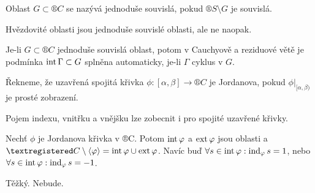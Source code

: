 \documentclass[12pt]{article}					%
\begin{document}
\begin{definice}
	Oblast $G \subset ®C$ se nazývá jednoduše souvislá, pokud $®S \setminus G$ je souvislá.
\end{definice}

\begin{poznamka}
	Hvězdovité oblasti jsou jednoduše souvislé oblasti, ale ne naopak.

	Je-li $G \subset ®C$ jednoduše souvislá oblast, potom v Cauchyově a reziduové větě je podmínka $\operatorname{int} \Gamma \subset G$ splněna automaticky, je-li $\Gamma$ cyklus v $G$.
\end{poznamka}

\begin{definice}
	Řekneme, že uzavřená spojitá křivka $\phi: [\alpha, \beta] \rightarrow ®C$ je Jordanova, pokud $\phi|_{[\alpha, \beta)}$ je prosté zobrazení.
\end{definice}

\begin{poznamka}
	Pojem indexu, vnitřku a vnějšku lze zobecnit i pro spojité uzavřené křivky.
\end{poznamka}

\begin{veta}
	Nechť $\phi$ je Jordanova křivka v ®C. Potom $\operatorname{int} \varphi$ a $\operatorname{ext} \varphi$ jsou oblasti a $®C \setminus \<\phi\> = \Int \phi \cup \Ext \phi$. Navíc buď $\forall s \in \operatorname{int} \varphi : \operatorname{ind}_\varphi s = 1$, nebo $\forall s \in \operatorname{int} \varphi: \operatorname{ind}_\varphi s = -1$.

	\begin{dukazin}
		Těžký. Nebude.
	\end{dukazin}
\end{veta}
\end{document}
